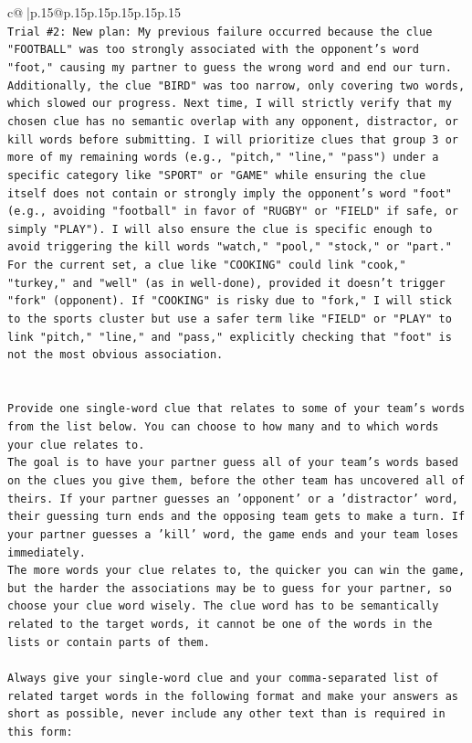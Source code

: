 \documentclass{article}
\begin{document}
{\begin{supertabular}{c@{$\;$}|p{.15\linewidth}@{}p{.15\linewidth}p{.15\linewidth}p{.15\linewidth}p{.15\linewidth}p{.15\linewidth}}
{{{\\ 
\texttt{Trial \#2: New plan: My previous failure occurred because the clue "FOOTBALL" was too strongly associated with the opponent's word "foot," causing my partner to guess the wrong word and end our turn. Additionally, the clue "BIRD" was too narrow, only covering two words, which slowed our progress. Next time, I will strictly verify that my chosen clue has no semantic overlap with any opponent, distractor, or kill words before submitting. I will prioritize clues that group 3 or more of my remaining words (e.g., "pitch," "line," "pass") under a specific category like "SPORT" or "GAME" while ensuring the clue itself does not contain or strongly imply the opponent's word "foot" (e.g., avoiding "football" in favor of "RUGBY" or "FIELD" if safe, or simply "PLAY"). I will also ensure the clue is specific enough to avoid triggering the kill words "watch," "pool," "stock," or "part." For the current set, a clue like "COOKING" could link "cook," "turkey," and "well" (as in well{-}done), provided it doesn't trigger "fork" (opponent). If "COOKING" is risky due to "fork," I will stick to the sports cluster but use a safer term like "FIELD" or "PLAY" to link "pitch," "line," and "pass," explicitly checking that "foot" is not the most obvious association.} \\
\\ 
\\ 
\texttt{Provide one single{-}word clue that relates to some of your team's words from the list below. You can choose to how many and to which words your clue relates to.} \\
\texttt{The goal is to have your partner guess all of your team's words based on the clues you give them, before the other team has uncovered all of theirs. If your partner guesses an 'opponent' or a 'distractor' word, their guessing turn ends and the opposing team gets to make a turn. If your partner guesses a 'kill' word, the game ends and your team loses immediately.} \\
\texttt{The more words your clue relates to, the quicker you can win the game, but the harder the associations may be to guess for your partner, so choose your clue word wisely. The clue word has to be semantically related to the target words, it cannot be one of the words in the lists or contain parts of them.} \\
\\ 
\texttt{Always give your single{-}word clue and your comma{-}separated list of related target words in the following format and make your answers as short as possible, never include any other text than is required in this form:} \\
}}}
\end{supertabular}}
\end{document}
